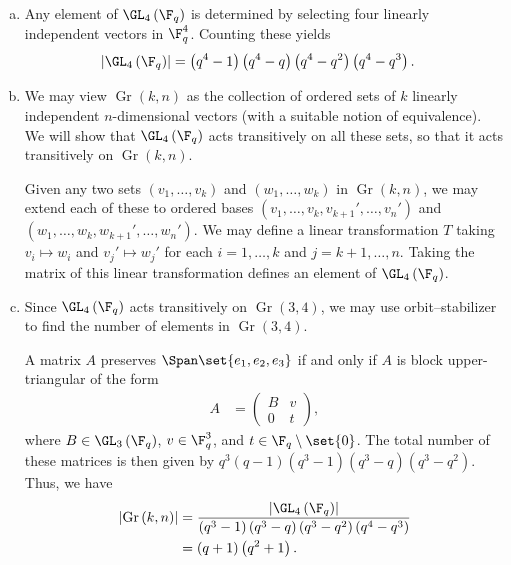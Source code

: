 \documentclass[10pt]{mypackage}
\begin{document}
\begin{solution}\hfill
  \begin{enumerate}[(a)]
    \item Any element of $\GL_4\left( \F_q \right)$ is determined by selecting four linearly independent vectors in $\F_q^{4}$. Counting these yields
      \begin{align*}
        \left\vert \GL_4\left( \F_q \right) \right\vert &= \left( q^{4}-1 \right)\left( q^{4}-q \right)\left( q^{4}-q^2 \right)\left( q^{4}-q^3 \right).
      \end{align*}
    \item We may view $\operatorname{Gr}\left( k,n \right)$ as the collection of ordered sets of $k$ linearly independent $n$-dimensional vectors (with a suitable notion of equivalence). We will show that $\GL_4\left( \F_q \right)$ acts transitively on all these sets, so that it acts transitively on $\operatorname{Gr}\left( k,n \right)$.

      Given any two sets $\left( v_1,\dots,v_k \right)$ and $\left( w_1,\dots,w_k \right)$ in $\operatorname{Gr}\left( k,n \right)$, we may extend each of these to ordered bases $\left( v_1,\dots,v_k,v_{k+1}',\dots,v_n'\right)$ and $\left( w_1,\dots,w_k,w_{k+1}',\dots,w_{n}' \right)$. We may define a linear transformation $T$ taking $v_i\mapsto w_i$ and $v_j'\mapsto w_j'$ for each $i=1,\dots,k$ and $j=k+1,\dots,n$. Taking the matrix of this linear transformation defines an element of $\GL_4\left( \F_q \right)$.
    \item Since $\GL_4\left( \F_q \right)$ acts transitively on $\operatorname{Gr}\left( 3,4 \right)$, we may use orbit--stabilizer to find the number of elements in $\operatorname{Gr}\left( 3,4 \right)$.

      A matrix $A$ preserves $\Span\set{e_1,e_2,e_3}$ if and only if $A$ is block upper-triangular of the form
      \begin{align*}
        A &= \begin{pmatrix}B & v \\ 0 & t\end{pmatrix},
      \end{align*}
      where $B\in \GL_3\left( \F_q \right)$, $v\in \F_q^{3}$, and $t\in \F_q\setminus\set{0}$. The total number of these matrices is then given by $q^3\left( q-1 \right)\left( q^3-1 \right)\left( q^3-q \right)\left( q^3-q^2 \right)$. Thus, we have
      \begin{align*}
        \left\vert \operatorname{Gr}\left( k,n \right) \right\vert &= \frac{\left\vert \GL_4\left( \F_q \right) \right\vert}{\left( q^3-1 \right)\left( q^3-q \right)\left( q^3-q^2 \right)\left( q^4-q^3 \right)}\\
                                                                   &= \left( q+1 \right)\left( q^2 + 1 \right).
      \end{align*}
  \end{enumerate}
\end{solution}
\end{document}

